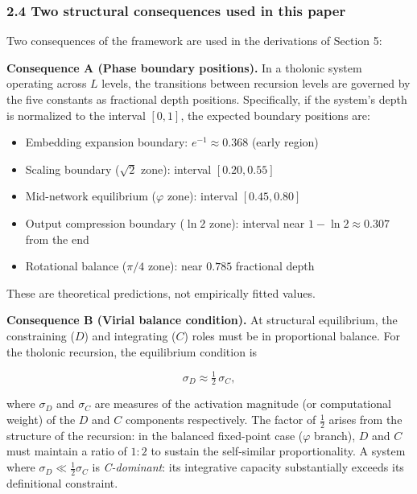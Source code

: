 \documentclass[
  11pt,
  letterpaper,
]{article}
\providecommand{\tightlist}{%
  \setlength{\itemsep}{0pt}\setlength{\parskip}{0pt}}
\begin{document}
\subsubsection{2.4 Two structural consequences used in this
paper}\label{two-structural-consequences-used-in-this-paper}

Two consequences of the framework are used in the derivations of Section
5:

\textbf{Consequence A (Phase boundary positions).} In a tholonic system
operating across \(L\) levels, the transitions between recursion levels
are governed by the five constants as fractional depth positions.
Specifically, if the system's depth is normalized to the interval
\([0, 1]\), the expected boundary positions are:

\begin{itemize}
\tightlist
\item
  Embedding expansion boundary: \(e^{-1} \approx 0.368\) (early region)
\item
  Scaling boundary (\(\sqrt{2}\) zone): interval \([0.20, 0.55]\)
\item
  Mid-network equilibrium (\(\varphi\) zone): interval \([0.45, 0.80]\)
\item
  Output compression boundary (\(\ln 2\) zone): interval near
  \(1 - \ln 2 \approx 0.307\) from the end
\item
  Rotational balance (\(\pi/4\) zone): near \(0.785\) fractional depth
\end{itemize}

These are theoretical predictions, not empirically fitted values.

\textbf{Consequence B (Virial balance condition).} At structural
equilibrium, the constraining (\(D\)) and integrating (\(C\)) roles must
be in proportional balance. For the tholonic recursion, the equilibrium
condition is

\[\sigma_D \approx \tfrac{1}{2}\,\sigma_C,\]

where \(\sigma_D\) and \(\sigma_C\) are measures of the activation
magnitude (or computational weight) of the \(D\) and \(C\) components
respectively. The factor of \(\frac{1}{2}\) arises from the structure of
the recursion: in the balanced fixed-point case (\(\varphi\) branch),
\(D\) and \(C\) must maintain a ratio of \(1 : 2\) to sustain the
self-similar proportionality. A system where
\(\sigma_D \ll \frac{1}{2}\sigma_C\) is \emph{C-dominant}: its
integrative capacity substantially exceeds its definitional constraint.
\end{document}
